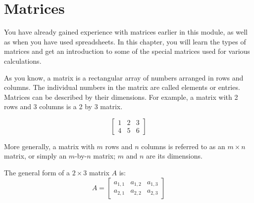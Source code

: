 \chapter{Matrices}
You have already gained experience with matrices earlier in this module, as well as when you have used spreadsheets. In this chapter, you will learn the types of matrices and get an introduction to some of the special matrices used for various calculations. 

As you know, a matrix is a rectangular array of numbers arranged in rows and columns. The individual numbers in the matrix are called elements or entries. Matrices can be described by their dimensions. For example, a matrix with 2 rows and 3 columns is a 2 by 3 matrix.

$$\begin{bmatrix}
1 & 2 & 3\\
4 & 5 & 6 
\end{bmatrix}
$$

More generally, a matrix with $m$ rows and $n$ columns is referred to as an $m \times n$ matrix, or simply an $m$-by-$n$ matrix; $m$ and $n$ are its dimensions.

The general form of a $2 \times 3$ matrix $A$ is:
$$
A = \begin{bmatrix}
a_{1,1} & a_{1,2} & a_{1,3} \\
a_{2,1} & a_{2,2} & a_{2,3}
\end{bmatrix}
$$

